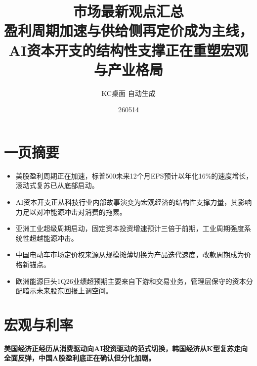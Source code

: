 \documentclass[11pt]{ctexart}
\title{\textbf{市场最新观点汇总}\\[0.4em]{\large 盈利周期加速与供给侧再定价成为主线，AI资本开支的结构性支撑正在重塑宏观与产业格局}}
\author{KC桌面 自动生成}
\date{260514}
\begin{document}
\maketitle
\section*{一页摘要}
\begin{itemize}
  \item 美股盈利周期正在加速，标普500未来12个月EPS预计以年化16\%的速度增长，滚动式复苏已从底部启动。
  \item AI资本开支正从科技行业内部故事演变为宏观经济的结构性支撑力量，其影响力足以对冲能源冲击对消费的拖累。
  \item 亚洲工业超级周期启动，固定资本投资增速预计三倍于前期，工业周期强度系统性超越能源冲击。
  \item 中国电动车市场定价权来源从规模摊薄切换为产品迭代速度，改款周期成为价格新锚点。
  \item 欧洲能源巨头1Q26业绩超预期主要来自下游和交易业务，管理层保守的资本分配暗示未来股东回报上调空间。
\end{itemize}
\section{宏观与利率}
\textbf{美国经济正经历从消费驱动向AI投资驱动的范式切换，韩国经济从K型复苏走向全面反弹，中国A股盈利底正在确认但分化加剧。}
\end{document}
